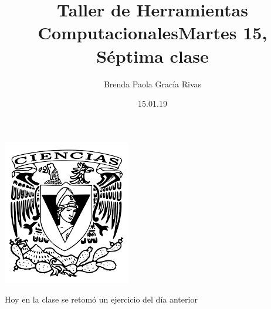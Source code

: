 \documentclass[letterpaper, 12pt, oneside]{article}
\title{\huge \color{green}Taller de Herramientas Computacionales}
\author{Brenda Paola Gracía Rivas}
\date{15.01.19}
\begin{document}
	\maketitle
	\begin{center}
		\includegraphics[scale=1.0]{1.png}
	\end{center}
	\newpage
	\title{Martes 15, Séptima clase\\}
	Hoy en la clase se retomó un ejercicio del día anterior
	
\end{document}

